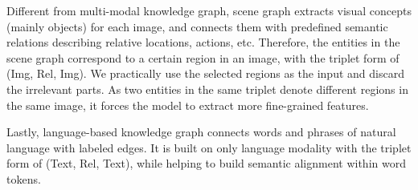 Different from multi-modal knowledge graph, scene graph extracts visual concepts (mainly objects) for each image, and connects them with predefined semantic relations describing relative locations, actions, etc. Therefore, the entities in the scene graph correspond to a certain region in an image, with the triplet form of (Img, Rel, Img). We practically use the selected regions as the input and discard the irrelevant parts. As two entities in the same triplet denote different regions in the same image, it forces the model to extract more fine-grained features.

Lastly, language-based knowledge graph connects words and phrases of natural language with labeled edges. It is built on only language modality with the triplet form of (Text, Rel, Text), while helping to build semantic alignment within word tokens.



